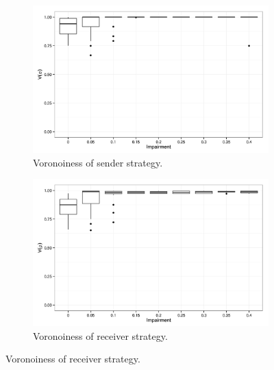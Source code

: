 \begin{figure}
        \begin{subfigure}{0.45\textwidth}
                \includegraphics[width=\textwidth]{plots/Speaker-Voronoiness-20140121-141158}
                \caption{Voronoiness of sender strategy.}
        \end{subfigure}
        \begin{subfigure}{0.45\textwidth}
                \includegraphics[width=\textwidth]{plots/Hearer-Voronoiness-20140121-141158}
                \caption{Voronoiness of receiver strategy.}
        \end{subfigure}


\end{figure}
